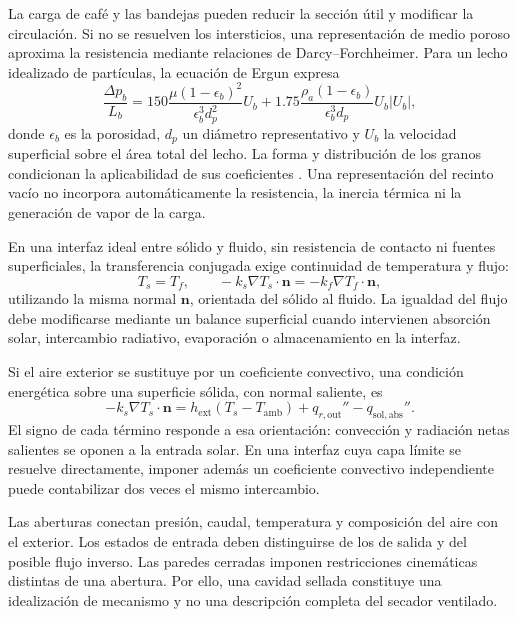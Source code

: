 La carga de café y las bandejas pueden reducir la sección útil y modificar la circulación. Si no se resuelven los intersticios, una representación de medio poroso aproxima la resistencia mediante relaciones de Darcy--Forchheimer. Para un lecho idealizado de partículas, la ecuación de Ergun expresa
\begin{equation}
\frac{\Delta p_b}{L_b}=
150\frac{\mu(1-\epsilon_b)^2}{\epsilon_b^3d_p^2}U_b
+1.75\frac{\rho_a(1-\epsilon_b)}{\epsilon_b^3d_p}U_b|U_b|,
\label{eq:ergun}
\end{equation}
donde $\epsilon_b$ es la porosidad, $d_p$ un diámetro representativo y $U_b$ la velocidad superficial sobre el área total del lecho. La forma y distribución de los granos condicionan la aplicabilidad de sus coeficientes \cite{ergun1952}. Una representación del recinto vacío no incorpora automáticamente la resistencia, la inercia térmica ni la generación de vapor de la carga.

En una interfaz ideal entre sólido y fluido, sin resistencia de contacto ni fuentes superficiales, la transferencia conjugada exige continuidad de temperatura y flujo:
\begin{equation}
T_s=T_f,
\qquad
-k_s\nabla T_s\cdot\mathbf n
=-k_f\nabla T_f\cdot\mathbf n,
\label{eq:interfaz_cht}
\end{equation}
utilizando la misma normal $\mathbf n$, orientada del sólido al fluido. La igualdad del flujo debe modificarse mediante un balance superficial cuando intervienen absorción solar, intercambio radiativo, evaporación o almacenamiento en la interfaz.

Si el aire exterior se sustituye por un coeficiente convectivo, una condición energética sobre una superficie sólida, con normal saliente, es
\begin{equation}
-k_s\nabla T_s\cdot\mathbf n
=h_{\mathrm{ext}}(T_s-T_{\mathrm{amb}})
+q_{r,\mathrm{out}}''-q_{\mathrm{sol},\mathrm{abs}}''.
\label{eqn:neumannexterno}
\end{equation}
El signo de cada término responde a esa orientación: convección y radiación netas salientes se oponen a la entrada solar. En una interfaz cuya capa límite se resuelve directamente, imponer además un coeficiente convectivo independiente puede contabilizar dos veces el mismo intercambio.

Las aberturas conectan presión, caudal, temperatura y composición del aire con el exterior. Los estados de entrada deben distinguirse de los de salida y del posible flujo inverso. Las paredes cerradas imponen restricciones cinemáticas distintas de una abertura. Por ello, una cavidad sellada constituye una idealización de mecanismo y no una descripción completa del secador ventilado.

